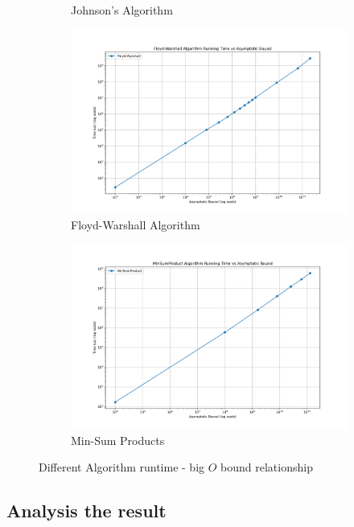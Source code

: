\documentclass[11pt]{article}
\theoremstyle{plain}
\begin{document}
\begin{figure}[H]
\begin{subfigure}[b]{0.45\textwidth}
      \caption{Johnson's Algorithm}
  \end{subfigure}
  \hfill
  \begin{subfigure}[b]{0.45\textwidth}
      \centering
      \includegraphics[width=\textwidth]{../results/Floyd-Warshall_running_time_bound.png}
      \caption{Floyd-Warshall Algorithm}
  \end{subfigure}
  \vfill
  \begin{subfigure}[b]{0.45\textwidth}
      \centering
      \includegraphics[width=\textwidth]{../results/MinSumProduct_running_time_bound.png}
      \caption{Min-Sum Products}
  \end{subfigure}
  \caption{Different Algorithm runtime - big $O$ bound relationship}
\end{figure}

\subsection{Analysis the result}\
\end{document}
